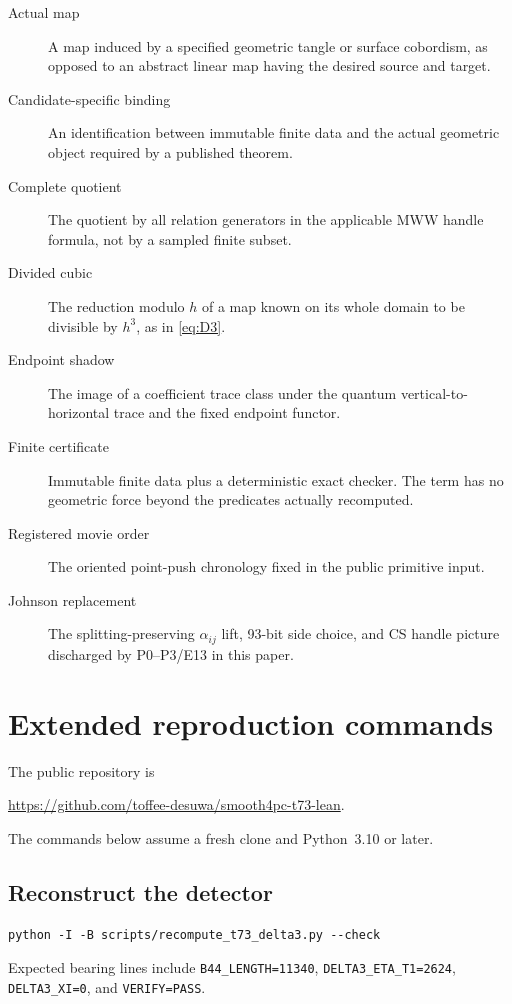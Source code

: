 \begin{description}
\item[Actual map]
A map induced by a specified geometric tangle or surface cobordism, as
opposed to an abstract linear map having the desired source and target.
\item[Candidate-specific binding]
An identification between immutable finite data and the actual geometric
object required by a published theorem.
\item[Complete quotient]
The quotient by all relation generators in the applicable MWW handle formula,
not by a sampled finite subset.
\item[Divided cubic]
The reduction modulo $h$ of a map known on its whole domain to be divisible by
$h^3$, as in \eqref{eq:D3}.
\item[Endpoint shadow]
The image of a coefficient trace class under the quantum
vertical-to-horizontal trace and the fixed endpoint functor.
\item[Finite certificate]
Immutable finite data plus a deterministic exact checker.  The term has no
geometric force beyond the predicates actually recomputed.
\item[Registered movie order]
The oriented point-push chronology fixed in the public primitive input.
\item[Johnson replacement]
The splitting-preserving $\alpha_{ij}$ lift, 93-bit side choice, and CS handle
picture discharged by P0--P3/E13 in this paper.
\end{description}

\section{Extended reproduction commands}\label{sec:reproducibility-extended}

The public repository is
\begin{center}
\url{https://github.com/toffee-desuwa/smooth4pc-t73-lean}.
\end{center}
The commands below assume a fresh clone and Python~3.10 or later.

\subsection{Reconstruct the detector}

\begin{verbatim}
python -I -B scripts/recompute_t73_delta3.py --check
\end{verbatim}
Expected bearing lines include
\texttt{B44\_LENGTH=11340},
\texttt{DELTA3\_ETA\_T1=2624},
\texttt{DELTA3\_XI=0}, and \texttt{VERIFY=PASS}.

